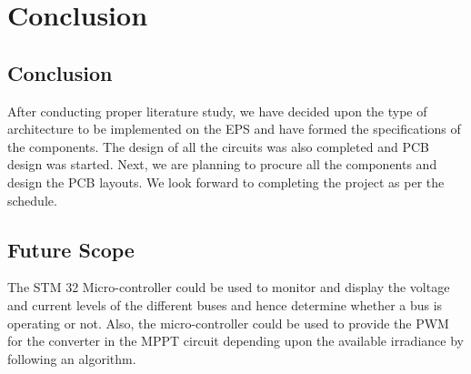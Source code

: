 

\chapter{Conclusion}

\section{Conclusion}
After conducting proper literature study, we have decided upon the type of architecture to be implemented on the EPS and have formed the specifications of the components. The design of all the circuits was also completed and PCB design was started. Next, we are planning to procure all the components and design the PCB layouts. We look forward to completing the project as per the schedule.
\section{Future Scope}
The STM 32 Micro-controller could be used to monitor and display the voltage and current levels of the different buses and hence determine whether a bus is operating or not. Also, the micro-controller could be used to provide the PWM for the converter in the MPPT circuit depending upon the available irradiance by following an algorithm.

